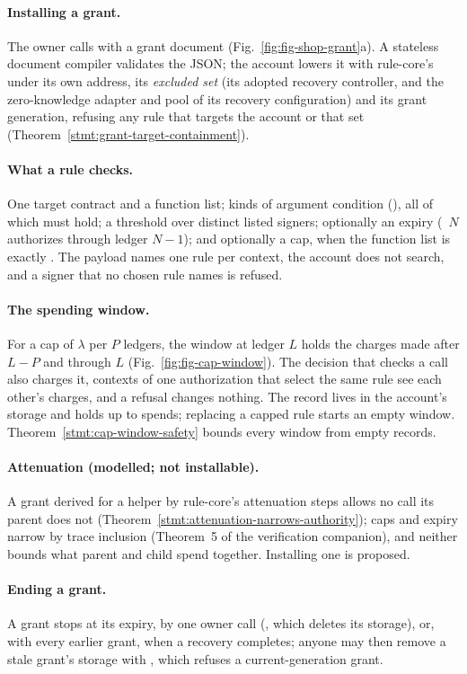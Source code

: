 
\paragraph{Installing a grant.} The owner calls  with a grant
document (Fig.~\ref{fig:fig-shop-grant}a). A stateless document compiler
validates the JSON; the account lowers it with rule-core's 
under its own address, its \emph{excluded set} (its adopted recovery
controller, and the zero-knowledge adapter and pool of its recovery
configuration) and its grant generation, refusing any rule that targets the
account or that set (Theorem~\ref{stmt:grant-target-containment}).

\paragraph{What a rule checks.} One target contract and a function list;
 kinds of argument condition (),
all of which must hold; a threshold over distinct listed signers; optionally an
expiry (~$N$ authorizes through ledger $N-1$); and
optionally a cap, when the function list is exactly \code{["transfer"]}. The
payload names one rule per context, the account does not search, and a signer
that no chosen rule names is refused.

\paragraph{The spending window.} For a cap of $\lambda$ per $P$ ledgers, the
window at ledger $L$ holds the charges made after $L-P$ and through $L$
(Fig.~\ref{fig:fig-cap-window}). The decision that checks a call also charges
it, contexts of one authorization that select the same rule see each other's
charges, and a refusal changes nothing. The record lives in the account's
storage and holds up to  spends; replacing a capped
rule starts an empty window. Theorem~\ref{stmt:cap-window-safety} bounds every
window from empty records.

\paragraph{Attenuation (modelled; not installable).} A grant derived for a helper
by rule-core's  attenuation steps allows no call its
parent does not (Theorem~\ref{stmt:attenuation-narrows-authority}); caps and expiry
narrow by trace inclusion (Theorem~5 of the verification companion), and
neither bounds what parent and child spend together. Installing one is
proposed.

\paragraph{Ending a grant.} A grant stops at its expiry, by one owner call
(, which deletes its storage), or, with every earlier grant,
when a recovery completes; anyone may then remove a stale grant's storage with
, which refuses a current-generation grant.

